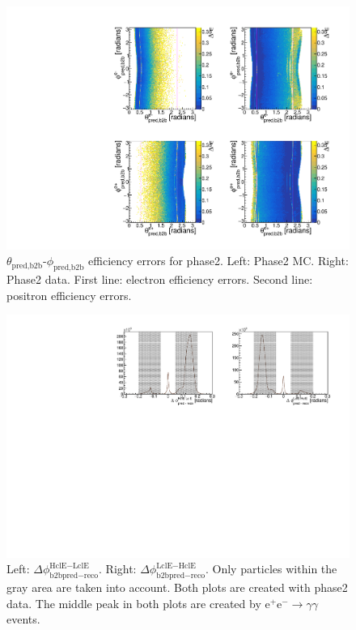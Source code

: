 \documentclass[a4paper,11pt,twosided,final,german,openbib,pdftex,listof=totoc,bibliography=totoc]{scrbook}
\begin{document}
\begin{appendix}
\begin{figure}[!htbp]
	\centering
	\includegraphics[width=\textwidth]{Plots/master/xCEffTP_MCData_Error.pdf}
	\caption[$\theta_{\textrm{pred,b2b}}$-$\phi_{\textrm{pred,b2b}}$ Efficiency Error Plots Phase2]{$\theta_{\textrm{pred,b2b}}$-$\phi_{\textrm{pred,b2b}}$ efficiency errors for phase2. Left: Phase2 MC. Right: Phase2 data. First line: electron efficiency errors. Second line: positron efficiency errors.}
	\label{plt:xCEff_Error}
\end{figure}



\begin{figure}[h!]
	\centering
	\includegraphics[width=\textwidth]{Plots/master/hb2b_Data.pdf}
	\caption[b2bClusterPhi - clusterPhi For Phase2 Data]{Left: $\Delta \phi _{\textrm{b2bpred} - \textrm{reco}}^{\textrm{HclE}-\textrm{LclE}}$. Right:  $\Delta \phi _{\textrm{b2bpred} - \textrm{reco}}^{\textrm{LclE}-\textrm{HclE}}$. Only particles within the gray area are taken into account. Both plots are created with phase2 data. The middle peak in both plots are created by $\textrm{e}^+\textrm{e}^- \rightarrow \gamma \gamma$ events.}
	\label{fig:b2bData2}
\end{figure}




\end{appendix}
\end{document}
